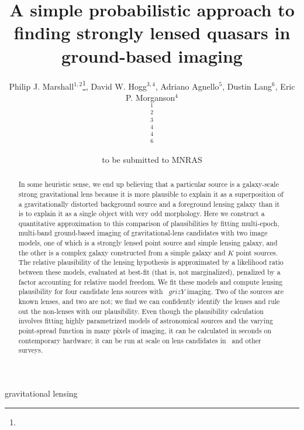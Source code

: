 \documentclass[useAMS,usenatbib]{mn2e}
\title[Finding lensed quasars]
{A simple probabilistic approach to finding 
strongly lensed quasars in ground-based imaging}
\author[]{%
  Philip J. Marshall$^{1,2}$\thanks{\pjmemail},
  David W. Hogg$^{3,4}$,
  Adriano Agnello$^{5}$,
  Dustin Lang$^{6}$,
  Eric P. Morganson$^{4}$ 
  \medskip\\
  $^1$\kipac\\
  $^2$\oxford\\
  $^3$\nyu\\
  $^4$\mpia\\
  $^4$\ucsb\\
  $^6$\cmu
}
\begin{document}
             
\date{to be submitted to MNRAS}
             
\pagerange{\pageref{firstpage}--\pageref{lastpage}}

\maketitle           

\label{firstpage}


\begin{abstract}
In some heuristic sense, we end up believing that a particular source
is a galaxy-scale strong gravitational lens because it is more
plausible to explain it as a superposition of a gravitationally
distorted background source and a foreground lensing galaxy than it is
to explain it as a single object with very odd morphology.  Here we
construct a quantitative approximation to this comparison of
plausibilities by fitting multi-epoch, multi-band ground-based imaging
of gravitational-lens candidates with two image models, one of which
is a strongly lensed point source and simple lensing galaxy, and the
other is a complex galaxy constructed from a simple galaxy and $K$
point sources.  The relative plausibility of the lensing hypothesis is
approximated by a likelihood ratio between these models, evaluated at
best-fit (that is, not marginalized), penalized by a factor accounting
for relative model freedom.  We fit these models and compute lensing
plausibility for four candidate lens sources with \panstarrs\ $grizY$
imaging.  Two of the sources are known lenses, and two are not; we
find we can confidently identify the lenses and rule out the
non-lenses with our plausibility.  Even though the plausibility
calculation involves fitting highly parametrized models of
astronomical sources and the varying point-spread function in many
pixels of imaging, it can be calculated in seconds on contemporary
hardware; it can be run at scale on lens candidates in \panstarrs\ and
other surveys.
\end{abstract}


\begin{keywords}
  gravitational lensing
\end{keywords}

\setcounter{footnote}{1}
\end{document}
